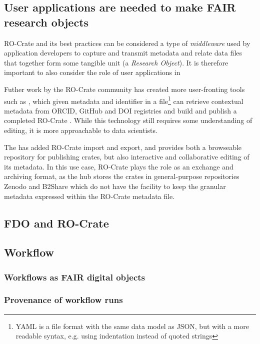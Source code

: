 \subsection{User applications are needed to make FAIR research objects}

RO-Crate and its best practices can be considered a type of \emph{middleware} used by application developers to capture and transmit metadata and relate data files that together form some tangible unit (a \emph{Research Object}). It is therefore important to also consider the role of user applications in 

Futher work by the RO-Crate community has created more user-fronting tools such as , which given metadata and identifier in a  file\footnote{YAML is a file format with the same data model as JSON, but with a more readable syntax, e.g. using indentation instead of quoted strings} can retrieve contextual metadata from ORCID, GitHub and DOI registries and build and publish a completed RO-Crate \cite{ya2ro}.   While this technology still requires some understanding of editing, it is more approachable to data scientists.

The  has added RO-Crate import and export, and provides both a browseable repository for publishing crates, but also interactive and collaborative editing of its metadata. In this use case, RO-Crate plays the role as an exchange and archiving format, as the hub stores the crates in general-purpose repositories Zenodo and B2Share which do not have the facility to keep the granular metadata expressed within the RO-Crate metadata file.


\subsection{FDO and RO-Crate}

\cite{FAIROs}

\subsection{Workflow}

\subsubsection{Workflows as FAIR digital objects}


\subsubsection{Provenance of workflow runs}


